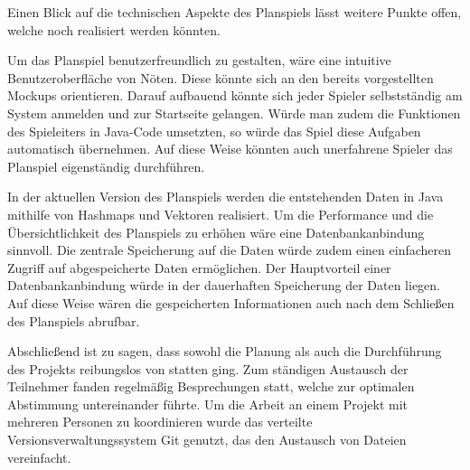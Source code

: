 Einen Blick auf die technischen Aspekte des Planspiels lässt weitere Punkte offen, welche noch realisiert werden könnten.

Um das Planspiel benutzerfreundlich zu gestalten, wäre eine intuitive Benutzeroberfläche von Nöten. Diese könnte sich
an den bereits vorgestellten Mockups orientieren. Darauf aufbauend könnte sich jeder Spieler selbstständig am System
anmelden und zur Startseite gelangen. Würde man zudem die Funktionen des Spieleiters in Java-Code umsetzten, so würde
das Spiel diese Aufgaben automatisch übernehmen. Auf diese Weise könnten auch unerfahrene Spieler das Planspiel eigenständig
durchführen.

In der aktuellen Version des Planspiels werden die entstehenden Daten in Java mithilfe von Hashmaps und Vektoren realisiert.
Um die Performance und die Übersichtlichkeit des Planspiels zu erhöhen wäre eine Datenbankanbindung sinnvoll. Die zentrale
Speicherung auf die Daten würde zudem einen einfacheren Zugriff auf abgespeicherte Daten ermöglichen. Der Hauptvorteil
einer Datenbankanbindung würde in der dauerhaften Speicherung der Daten liegen. Auf diese Weise wären die gespeicherten
Informationen auch nach dem Schließen des Planspiels abrufbar.

Abschließend ist zu sagen, dass sowohl die Planung als auch die Durchführung des Projekts reibungslos von statten ging.
Zum ständigen Austausch der Teilnehmer fanden regelmäßig Besprechungen statt, welche zur optimalen Abstimmung untereinander
führte. Um die Arbeit an einem Projekt mit mehreren Personen zu koordinieren wurde das verteilte Versionsverwaltungssystem
Git genutzt, das den Austausch von Dateien vereinfacht.
